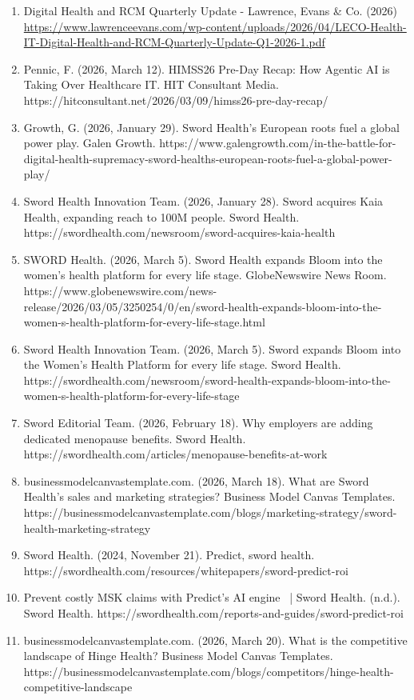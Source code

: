 \documentclass[12pt]{article}
\begin{document}
\begin{enumerate}
    \item Digital Health and RCM Quarterly Update - Lawrence, Evans \& Co. (2026) \url{https://www.lawrenceevans.com/wp-content/uploads/2026/04/LECO-Health-IT-Digital-Health-and-RCM-Quarterly-Update-Q1-2026-1.pdf}
    \item Pennic, F. (2026, March 12). HIMSS26 Pre-Day Recap: How Agentic AI is Taking Over Healthcare IT. HIT Consultant Media. https://hitconsultant.net/2026/03/09/himss26-pre-day-recap/
    \item Growth, G. (2026, January 29). Sword Health’s European roots fuel a global power play. Galen Growth. https://www.galengrowth.com/in-the-battle-for-digital-health-supremacy-sword-healths-european-roots-fuel-a-global-power-play/
    \item Sword Health Innovation Team. (2026, January 28). Sword acquires Kaia Health, expanding reach to 100M people. Sword Health. https://swordhealth.com/newsroom/sword-acquires-kaia-health
    \item SWORD Health. (2026, March 5). Sword Health expands Bloom into the women’s health platform for every life stage. GlobeNewswire News Room. https://www.globenewswire.com/news-release/2026/03/05/3250254/0/en/sword-health-expands-bloom-into-the-women-s-health-platform-for-every-life-stage.html
    \item Sword Health Innovation Team. (2026, March 5). Sword expands Bloom into the Women’s Health Platform for every life stage. Sword Health. https://swordhealth.com/newsroom/sword-health-expands-bloom-into-the-women-s-health-platform-for-every-life-stage
    \item Sword Editorial Team. (2026, February 18). Why employers are adding dedicated menopause benefits. Sword Health. https://swordhealth.com/articles/menopause-benefits-at-work
    \item businessmodelcanvastemplate.com. (2026, March 18). What are Sword Health’s sales and marketing strategies? Business Model Canvas Templates. https://businessmodelcanvastemplate.com/blogs/marketing-strategy/sword-health-marketing-strategy
    \item Sword Health. (2024, November 21). Predict, sword health. https://swordhealth.com/resources/whitepapers/sword-predict-roi
    \item Prevent costly MSK claims with Predict’s AI engine  | Sword Health. (n.d.). Sword Health. https://swordhealth.com/reports-and-guides/sword-predict-roi
    \item businessmodelcanvastemplate.com. (2026, March 20). What is the competitive landscape of Hinge Health? Business Model Canvas Templates. https://businessmodelcanvastemplate.com/blogs/competitors/hinge-health-competitive-landscape

\end{enumerate}
\end{document}
